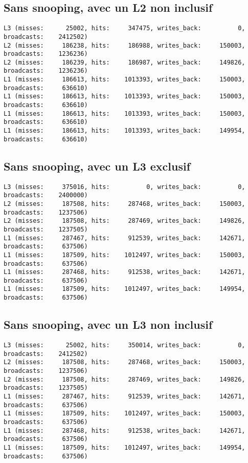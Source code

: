 \documentclass{article}
\begin{document}
{\newpage
\subsection*{Sans snooping, avec un L2 non inclusif}
\begin{verbatim}
L3 (misses:      25002, hits:     347475, writes_back:          0, broadcasts:    2412502)
L2 (misses:     186238, hits:     186988, writes_back:     150003, broadcasts:    1236236)
L2 (misses:     186239, hits:     186987, writes_back:     149826, broadcasts:    1236236)
L1 (misses:     186613, hits:    1013393, writes_back:     150003, broadcasts:     636610)
L1 (misses:     186613, hits:    1013393, writes_back:     150003, broadcasts:     636610)
L1 (misses:     186613, hits:    1013393, writes_back:     150003, broadcasts:     636610)
L1 (misses:     186613, hits:    1013393, writes_back:     149954, broadcasts:     636610)
\end{verbatim}

\subsection*{Sans snooping, avec un L3 exclusif}
\begin{verbatim}
L3 (misses:     375016, hits:          0, writes_back:          0, broadcasts:    2400000)
L2 (misses:     187508, hits:     287468, writes_back:     150003, broadcasts:    1237506)
L2 (misses:     187508, hits:     287469, writes_back:     149826, broadcasts:    1237505)
L1 (misses:     287467, hits:     912539, writes_back:     142671, broadcasts:     637506)
L1 (misses:     187509, hits:    1012497, writes_back:     150003, broadcasts:     637506)
L1 (misses:     287468, hits:     912538, writes_back:     142671, broadcasts:     637506)
L1 (misses:     187509, hits:    1012497, writes_back:     149954, broadcasts:     637506)
\end{verbatim}

\subsection*{Sans snooping, avec un L3 non inclusif}
\begin{verbatim}
L3 (misses:      25002, hits:     350014, writes_back:          0, broadcasts:    2412502)
L2 (misses:     187508, hits:     287468, writes_back:     150003, broadcasts:    1237506)
L2 (misses:     187508, hits:     287469, writes_back:     149826, broadcasts:    1237505)
L1 (misses:     287467, hits:     912539, writes_back:     142671, broadcasts:     637506)
L1 (misses:     187509, hits:    1012497, writes_back:     150003, broadcasts:     637506)
L1 (misses:     287468, hits:     912538, writes_back:     142671, broadcasts:     637506)
L1 (misses:     187509, hits:    1012497, writes_back:     149954, broadcasts:     637506)
\end{verbatim}

}
\end{document}

